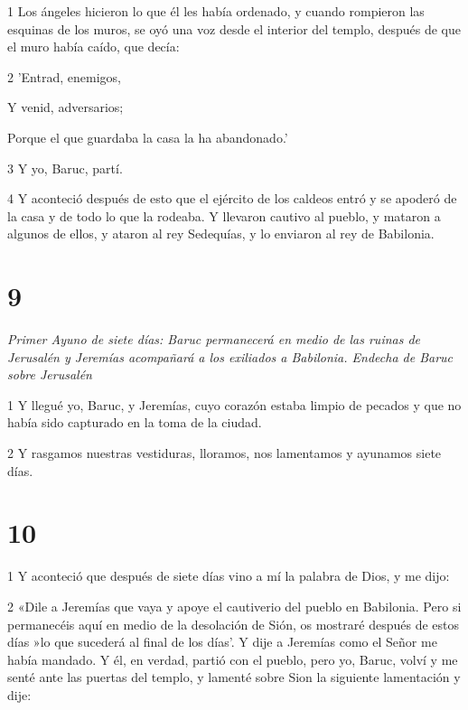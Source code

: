 \par 1 Los ángeles hicieron lo que él les había ordenado, y cuando rompieron las esquinas de los muros, se oyó una voz desde el interior del templo, después de que el muro había caído, que decía:

\par 2 'Entrad, enemigos,

\par Y venid, adversarios;

\par Porque el que guardaba la casa la ha abandonado.'

\par 3 Y yo, Baruc, partí.

\par 4 Y aconteció después de esto que el ejército de los caldeos entró y se apoderó de la casa y de todo lo que la rodeaba. Y llevaron cautivo al pueblo, y mataron a algunos de ellos, y ataron al rey Sedequías, y lo enviaron al rey de Babilonia.

\chapter{9}

\par \textit{Primer Ayuno de siete días: Baruc permanecerá en medio de las ruinas de Jerusalén y Jeremías acompañará a los exiliados a Babilonia. Endecha de Baruc sobre Jerusalén}

\par 1 Y llegué yo, Baruc, y Jeremías, cuyo corazón estaba limpio de pecados y que no había sido capturado en la toma de la ciudad.

\par 2 Y rasgamos nuestras vestiduras, lloramos, nos lamentamos y ayunamos siete días.

\chapter{10}

\par 1 Y aconteció que después de siete días vino a mí la palabra de Dios, y me dijo:

\par 2 «Dile a Jeremías que vaya y apoye el cautiverio del pueblo en Babilonia. Pero si permanecéis aquí en medio de la desolación de Sión, os mostraré después de estos días »lo que sucederá al final de los días'. Y dije a Jeremías como el Señor me había mandado. Y él, en verdad, partió con el pueblo, pero yo, Baruc, volví y me senté ante las puertas del templo, y lamenté sobre Sion la siguiente lamentación y dije:


